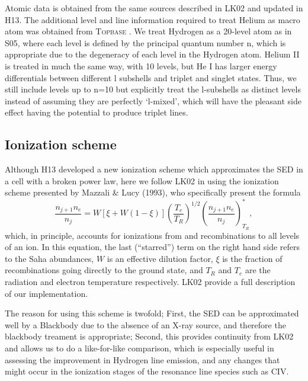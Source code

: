 \documentclass[useAMS,usenatbib, onecolumn]{mn2ejm}
\begin{document}
Atomic data is obtained from the same sources described in LK02 and updated in H13. 
The additional level and line information required to treat Helium as macro atom was 
obtained from \textsc{Topbase} \citep{topbase2005}. We treat Hydrogen as a 20-level atom as in S05, where 
each level is defined by the principal quantum number n, which is appropriate due to
the degeneracy of each level in the Hydrogen atom. Helium II is treated in much the same way,
with 10 levels, but He I has larger energy differentials between different l subshells
and triplet and singlet states. Thus, we still include levels up to n=10 but explicitly 
treat the l-subshells as distinct levels instead of assuming they are perfectly `l-mixed',
which will have the pleasant side effect having the potential to produce triplet lines.

\subsection{Ionization scheme}

Although H13 developed a new ionization scheme which approximates the 
SED in a cell with a broken power law, here we follow LK02 in using the
ionization scheme presented by Mazzali \& Lucy (1993), who specifically
present the formula 
\begin{equation}
\frac{n_{j+1} n_e}{n_j} = W [\xi + W(1-\xi)]
\left(\frac{T_e}{T_R}\right)^{1/2}
\left(\frac{n_{j+1}n_e}{n_j}\right)^*_{T_R}, \label{ionization}
\end{equation}
which, in principle, accounts for ionizations from and
recombinations to all levels of an ion. In this equation, the last
(``starred'') term on the right hand side refers to the Saha
abundances, $W$ is an effective dilution factor, $\xi$ is the
fraction of recombinations going directly to the ground state, and
$T_R$ and $T_e$ are the radiation and electron temperature
respectively. LK02 provide a full description of our implementation.


The reason for using this scheme 
is twofold; First, the SED can be approximated well by a Blackbody due to the 
absence of an X-ray source, and therefore the blackbody treament is appropriate; 
Second, this provides continuity from LK02 and allows us to do a like-for-like comparison,
which is especially useful in assessing the improvement in Hydrogen line emission, and any changes
that might occur in the ionization stages of the resonance line species such as CIV. 


%
%
\end{document}
